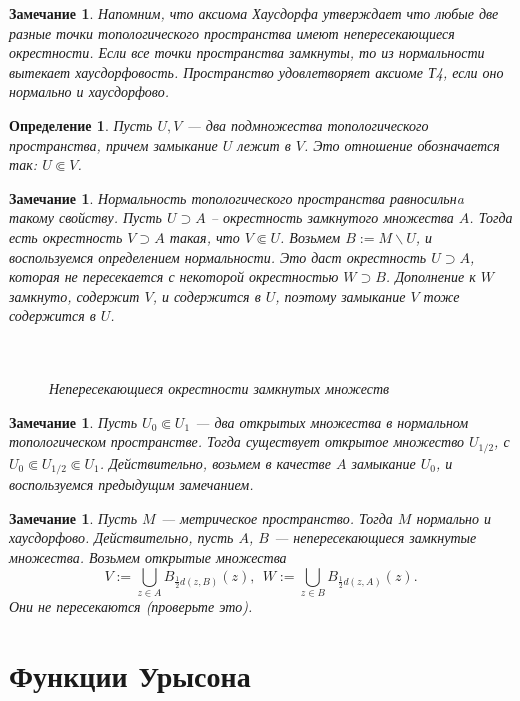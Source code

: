 \documentclass[12pt]{book}
\theoremstyle{upshape}
\newtheorem{zadacha}{Задача}[chapter]
\theoremstyle{generic}
\newtheorem{opredelenie}[teorema]{Определение}
\newtheorem{remark}[teorema]{Замечание}
\def\замечание{\begin{remark}}
\def\еза{\end{remark}}
\theoremstyle{upshapenonumber}
\newcommand{\следствие}{%
     \refstepcounter{teorema}
     {\noindent\bf Следствие \thechapter.\arabic{teorema}:\ }}
\newcommand{\пример}{%
     \refstepcounter{teorema}
     {\noindent\bf Пример \thechapter.\arabic{teorema}:\ }}
\newcommand{\лемма}{%
     \refstepcounter{teorema}
     {\noindent\bf Лемма \thechapter.\arabic{teorema}:\ }}
\newcommand{\теорема}{%
     \refstepcounter{teorema}
     {\noindent\bf Теорема \thechapter.\arabic{teorema}:\ }}
\newcommand{\утверждение}{%
     \refstepcounter{teorema}
     {\noindent\bf Утверждение \thechapter.\arabic{teorema}:\ }}
\def\ем{\em}
\def\задача{\begin{zadacha}}
\def\ез{\end{zadacha}}
\def\еу{\end{ukazanie}}
\def\определение{\begin{opredelenie}}
\def\ео{\end{opredelenie}}
\def\енум{\begin{enumerate}}
\def\ее{\end{enumerate}}
\begin{document}
\замечание
Напомним, что {\ем аксиома Хаусдорфа} утверждает что любые
две разные точки топологического пространства 
имеют непересекающиеся окрестности.
Если все точки пространства замкнуты, то из нормальности вытекает
хаусдорфовость. Пространство удовлетворяет аксиоме
Т4, если оно нормально и хаусдорфово.
\еза

\определение
Пусть $U,V$ --- два подмножества топологического
пространства, причем замыкание $U$ лежит в $V$. Это 
отношение обозначается так: $U \Subset V$.
\ео

\замечание 
Нормальность топологического пространства
равносильнa такому свойству. Пусть $U\supset A$ --
окрестность замкнутого множества $A$. Тогда 
есть окрестность $V \supset A$ такая, что
$V\Subset U$. Возьмем $B:= M\backslash U$,
и воспользуемся определением нормальности.
Это даст окрестность $U\supset A$, которая
не пересекается с некоторой окрестностью 
$W\supset B$. Дополнение к $W$ замкнуто,
содержит $V$, и содержится в $U$, поэтому
замыкание $V$ тоже содержится в $U$.
\еза

\begin{figure}[ht]
\begin{center}\ \\
\\
{\small \em Непересекающиеся окрестности замкнутых множеств}
\end{center}
\end{figure}

\замечание\label{_exist_interme_okre_Zamechanie_}
Пусть $U_0\Subset U_1$ --- два открытых множества в нормальном
топологическом пространстве. Тогда существует открытое множество $U_{1/2}$,
с $U_0\Subset U_{1/2} \Subset U_1$. Действительно,
возьмем в качестве $A$ замыкание $U_0$, и воспользуемся
предыдущим замечанием.
\еза



\замечание
Пусть $M$ --- метрическое пространство. 
Тогда $M$ нормально и хаусдорфово. Действительно,
пусть $A$, $B$ --- непересекающиеся замкнутые множества.
Возьмем открытые множества
\[
V:= \bigcup_{z\in A} B_{\frac 1 2 d(z, B)}(z), \ \ 
W:= \bigcup_{z\in B} B_{\frac 1 2 d(z, A)}(z).
\]
Они не пересекаются (проверьте это).
\еза



\section{Функции Урысона}
\end{document}
